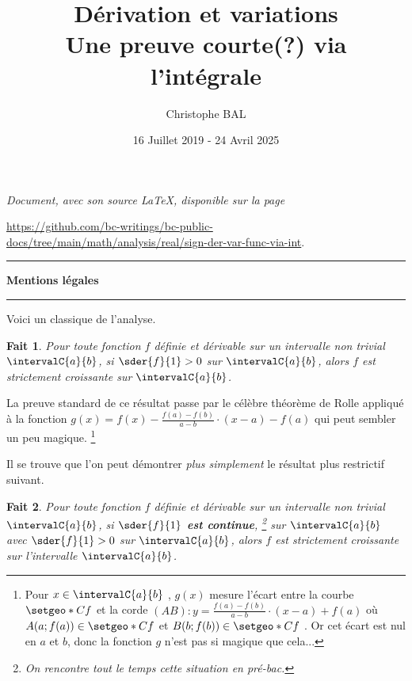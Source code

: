 \documentclass[12pt]{amsart}
\newtheorem{fact}{Fait}
\begin{document}
\title{Dérivation et variations \\ Une preuve courte(?) via l'intégrale}
\author{Christophe BAL}
\date{16 Juillet 2019 - 24 Avril 2025}

\maketitle

\begin{center}
	\itshape
	Document, avec son source \LaTeX, disponible sur la page

	\url{https://github.com/bc-writings/bc-public-docs/tree/main/math/analysis/real/sign-der-var-func-via-int}.
\end{center}


\bigskip


\begin{center}
	\hrule\vspace{.3em}
	{
		\fontsize{1.35em}{1em}\selectfont
		\textbf{Mentions \og légales \fg}
	}

	\vspace{0.45em}
	\doclicenseThis
	\hrule
\end{center}


\vspace{1em}


Voici un classique de l'analyse.


\begin{fact}
	Pour toute fonction $f$ définie et dérivable sur un intervalle non trivial $\intervalC{a}{b}$,
	si $\sder{f}{1} > 0$ sur $\intervalC{a}{b}$,
	alors $f$ est strictement croissante sur $\intervalC{a}{b}$.
\end{fact}

La preuve standard de ce résultat passe par le célèbre théorème de Rolle appliqué à la fonction $g(x) = f(x) - \frac{f(a) - f(b)}{a - b} \cdot (x - a) - f(a)$ qui peut sembler un peu magique.%
\footnote{
	Pour $x \in \intervalC{a}{b}$ , $g(x)$ mesure l'écart entre la courbe $\setgeo*{C}{f}$ et la corde $(AB) : y = \frac{f(a) - f(b)}{a - b} \cdot (x - a) + f(a)$ où $A(a ; f(a)) \in \setgeo*{C}{f}$ et $B(b ; f(b)) \in \setgeo*{C}{f}$ .
	Or cet écart est nul en $a$ et $b$, donc la fonction $g$ n'est pas si magique que cela...
}


\bigskip


Il se trouve que l'on peut démontrer \emph{\og plus simplement \fg} le résultat plus restrictif suivant.


\begin{fact}
	Pour toute fonction $f$ définie et dérivable sur un intervalle non trivial $\intervalC{a}{b}$,
	si \textbf{$\sder{f}{1}$ est continue},%
	\footnote{
		On rencontre tout le temps cette situation en pré-bac.
	}
	sur $\intervalC{a}{b}$ avec $\sder{f}{1} > 0$ sur $\intervalC{a}{b}$,
	alors $f$ est strictement croissante sur l'intervalle $\intervalC{a}{b}$.
\end{fact}
\end{document}
